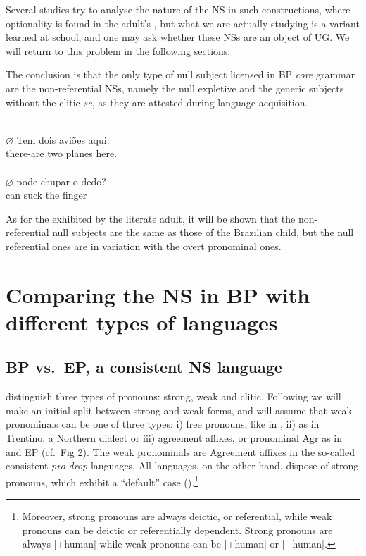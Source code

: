 \documentclass[output=paper]{langsci/langscibook}
\begin{document}
Several studies try to analyse the nature of the NS in such constructions,
where optionality is found in the adult’s , but what we are actually
studying is a variant learned at school, and one may ask whether these NSs are
an object of \gls{UG}. We will return to this problem in the following
sections.

The conclusion is that the only type of null subject licensed in
\gls{BP} \emph{core} grammar are the non-referential
NSs, namely the null expletive and the generic subjects without the clitic
\emph{se}, as they are attested during language acquisition.

\ea%
    \label{ex:key:26.16}
    \ea \textcite{Simoes2000}\\
    \gll    $\varnothing$\tss{\Expl} Tem dois aviões aqui.\\
            {} there-are two planes here.\\
    \ex \textcite{Magalhaes2007}\\
    \gll    $\varnothing$\tss{\Genc} pode chupar o dedo?\\
            {} can  suck the finger\\
    \z
\z

As for the  exhibited by the literate adult, it will be shown that
the non-referential null subjects are the same as those of the Brazilian child,
but the null referential ones are in variation with the overt pronominal ones.

\section{Comparing the NS in BP with different types of
languages}\label{sec:key:26.3}

\subsection{BP vs.\ EP, a consistent NS language}\label{sec:key:26.3.1}

\citet{CarSta1994} distinguish three types of pronouns: strong, weak and
clitic.  Following \citet{Kato1999} we will make an initial split between
strong and weak forms, and will assume that weak pronominals can be one of
three types: i) free pronouns, like in , ii)  as in
Trentino, a Northern  dialect or iii) agreement affixes, or
pronominal Agr as in  and \gls{EP} (cf.\
Fig 2). The weak pronominals are Agreement affixes in the so-called consistent
\emph{pro-drop} languages. All languages, on the other hand, dispose of strong
pronouns, which exhibit a “default” case
(\citealt{Kato2000,Schutze2001}).\footnote{Moreover, strong pronouns are always
deictic, or referential, while weak pronouns can be deictic or referentially
dependent.  Strong pronouns are always [+human] while weak pronouns can be
[+human] or [−human].}
\end{document}
